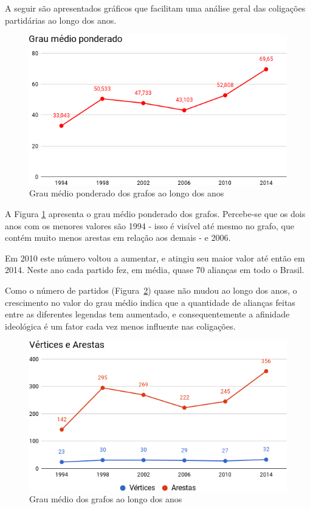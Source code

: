 A seguir são apresentados gráficos que facilitam uma análise geral das coligações partidárias ao longo dos anos. 

\begin{figure}[h]
\includegraphics[width=1\textwidth]{4-resultados/graficos/graumedioponderado.png}
\centering
\caption{
    Grau médio ponderado dos grafos ao longo dos anos
}
\label{fig:grafico-graumedioponderado}
\end{figure}

A Figura \ref{fig:grafico-graumedioponderado} apresenta o grau médio ponderado dos grafos. Percebe-se que os dois anos com os menores valores são 1994 - isso é visível até mesmo no grafo, que contém muito menos arestas em relação aos demais -  e 2006.

Em 2010 este número voltou a aumentar, e atingiu seu maior valor até então em 2014. Neste ano cada partido fez, em média, quase 70 alianças em todo o Brasil. 

Como o número de partidos (Figura~\ref{fig:grafico-verticesarestas}) quase não mudou ao longo dos anos, o crescimento no valor do grau médio indica que a quantidade de alianças feitas entre as diferentes legendas tem aumentado, e consequentemente a afinidade ideológica é um fator cada vez menos influente nas coligações.

\begin{figure}[h]
\includegraphics[width=1\textwidth]{4-resultados/graficos/vertices-arestas.png}
\centering
\caption{
    Grau médio dos grafos ao longo dos anos
}
\label{fig:grafico-verticesarestas}
\end{figure}

